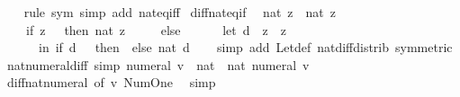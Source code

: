 \begin{isabellebody}
%
\isadelimproof
\ \ %
\endisadelimproof
%
\isatagproof
{}\isamarkupfalse%
\ {\isacharparenleft}{\kern0pt}rule\ sym{\isacharparenright}{\kern0pt}\ {\isacharparenleft}{\kern0pt}simp\ add{\isacharcolon}{\kern0pt}\ nat{\isacharunderscore}{\kern0pt}eq{\isacharunderscore}{\kern0pt}iff{\isacharparenright}{\kern0pt}%
\endisatagproof
{\isafoldproof}%
%
\isadelimproof
\isanewline
%
\endisadelimproof
\isanewline
{}\isamarkupfalse%
\ diff{\isacharunderscore}{\kern0pt}nat{\isacharunderscore}{\kern0pt}eq{\isacharunderscore}{\kern0pt}if{\isacharcolon}{\kern0pt}\isanewline
\ \ {\isachardoublequoteopen}nat\ z\ {\isacharminus}{\kern0pt}\ nat\ z{\isacharprime}{\kern0pt}\ {\isacharequal}{\kern0pt}\isanewline
\ \ \ \ {\isacharparenleft}{\kern0pt}if\ z{\isacharprime}{\kern0pt}\ {\isacharless}{\kern0pt}\ {}\ then\ nat\ z\isanewline
\ \ \ \ \ else\isanewline
\ \ \ \ \ \ let\ d\ {\isacharequal}{\kern0pt}\ z\ {\isacharminus}{\kern0pt}\ z{\isacharprime}{\kern0pt}\isanewline
\ \ \ \ \ \ in\ if\ d\ {\isacharless}{\kern0pt}\ {}\ then\ {}\ else\ nat\ d{\isacharparenright}{\kern0pt}{\isachardoublequoteclose}\isanewline
%
\isadelimproof
\ \ %
\endisadelimproof
%
\isatagproof
{}\isamarkupfalse%
\ {\isacharparenleft}{\kern0pt}simp\ add{\isacharcolon}{\kern0pt}\ Let{\isacharunderscore}{\kern0pt}def\ nat{\isacharunderscore}{\kern0pt}diff{\isacharunderscore}{\kern0pt}distrib\ {\isacharbrackleft}{\kern0pt}symmetric{\isacharbrackright}{\kern0pt}{\isacharparenright}{\kern0pt}%
\endisatagproof
{\isafoldproof}%
%
\isadelimproof
\isanewline
%
\endisadelimproof
\isanewline
{}\isamarkupfalse%
\ nat{\isacharunderscore}{\kern0pt}numeral{\isacharunderscore}{\kern0pt}diff{\isacharunderscore}{\kern0pt}{}\ {\isacharbrackleft}{\kern0pt}simp{\isacharbrackright}{\kern0pt}{\isacharcolon}{\kern0pt}\ {\isachardoublequoteopen}numeral\ v\ {\isacharminus}{\kern0pt}\ {\isacharparenleft}{\kern0pt}{}{\isacharcolon}{\kern0pt}{\isacharcolon}{\kern0pt}nat{\isacharparenright}{\kern0pt}\ {\isacharequal}{\kern0pt}\ nat\ {\isacharparenleft}{\kern0pt}numeral\ v\ {\isacharminus}{\kern0pt}\ {}{\isacharparenright}{\kern0pt}{\isachardoublequoteclose}\isanewline
%
\isadelimproof
\ \ %
\endisadelimproof
%
\isatagproof
{}\isamarkupfalse%
\ diff{\isacharunderscore}{\kern0pt}nat{\isacharunderscore}{\kern0pt}numeral\ {\isacharbrackleft}{\kern0pt}of\ v\ Num{\isachardot}{\kern0pt}One{\isacharbrackright}{\kern0pt}\ \isamarkupfalse%
\ simp%
\endisatagproof
{\isafoldproof}%
%
\isadelimproof

\end{isabellebody}
